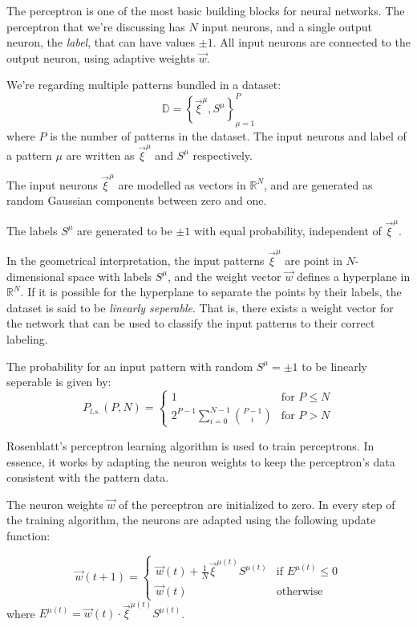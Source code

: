 The perceptron is one of the most basic building blocks for neural networks.
The perceptron that we're discussing has \(N\) input neurons, and a single output neuron, the \emph{label}, that can have values \(\pm1\).
All input neurons are connected to the output neuron, using adaptive weights \(\vec{w}\).

We're regarding multiple patterns bundled in a dataset:
\[ \mathbb{D} = \left\{ \vec{\xi}^\mu, S^\mu \right\} _{\mu=1}^{P} \]
where \(P\) is the number of patterns in the dataset.
The input neurons and label of a pattern \(\mu\) are written as \(\vec{\xi}^\mu\) and \(S^\mu\) respectively.

The input neurons \(\vec{\xi}^\mu\) are modelled as vectors in \(\mathbb{R}^N\), and are generated as random Gaussian components between zero and one.

The labels \(S^\mu\) are generated to be \(\pm1\) with equal probability, independent of \(\vec{\xi}^\mu\).

In the geometrical interpretation, the input patterns \(\vec{\xi}^\mu\) are point in \(N\)-dimensional space with labels \(S^\mu\), and the weight vector \(\vec{w}\) defines a hyperplane in \(\mathbb{R}^N\).
If it is possible for the hyperplane to separate the points by their labels, the dataset is said to be \emph{linearly seperable}.
That is, there exists a weight vector for the network that can be used to classify the input patterns to their correct labeling.

The probability for an input pattern with random \(S^\mu = \pm1\) to be linearly seperable is given by\cite{perceptron_slides2}:
\[
P_{l.s.}(P, N) = 
\begin{cases}
    1                                       & \text{for } P\leq N \\
    2^{P-1}\sum_{i=0}^{N-1}\binom{P - 1}{i} & \text{for } P > N
\end{cases}
\]

Rosenblatt's perceptron learning algorithm\cite{rosenblatt1958perceptron} is used to train perceptrons.
In essence, it works by adapting the neuron weights to keep the perceptron's data consistent with the pattern data.

The neuron weights \(\vec{w}\) of the perceptron are initialized to zero.
In every step of the training algorithm, the neurons are adapted using the following update function:

\[
\vec{w}(t + 1) = 
\begin{cases}
    \vec{w}(t) + \frac{1}{N}\vec{\xi}^{\mu(t)}S^{\mu(t)}    & \text{if } E^{\mu(t)} \leq 0 \\
    \vec{w}(t)                                              & \text{otherwise}
\end{cases}
\]
where \(E^{\mu(t)} = \vec{w}(t)\cdot\vec{\xi}^{\mu(t)}S^{\mu(t)}\).

